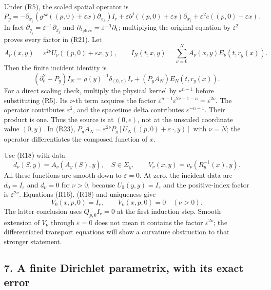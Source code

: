 \documentclass[
  11pt,
]{article}
\begin{document}
Under (R5), the scaled spatial operator is \[
 P_y=-\partial_{x_j}(g^{jk}((p,0)+\varepsilon x)\partial_{x_k})I_r
   +\varepsilon b^j((p,0)+\varepsilon x)\partial_{x_j}
   +\varepsilon^2c((p,0)+\varepsilon x).                    \tag{R21}
\] In fact \(\partial_{q_j}=\varepsilon^{-1}\partial_{x_j}\) and
\(\partial_{t_{\rm phys}}=\varepsilon^{-1}\partial_t\); multiplying the
original equation by \(\varepsilon^2\) proves every factor in (R21). Let
\[
 A_\nu(x,y)=\varepsilon^{2\nu}U_\nu((p,0)+\varepsilon x,y),
 \qquad I_N(t,x,y)=\sum_{\nu=0}^N A_\nu(x,y)E_\nu(t,r_y(x)).  \tag{R22}
\] Then the finite incident identity is \[
 (\partial_t^2+P_y)I_N
   =\rho(y)^{-1}\delta_{(0,e)}I_r
          +(P_yA_N)E_N(t,r_y(x)).                           \tag{R23}
\] For a direct scaling check, multiply the physical kernel by
\(\varepsilon^{n-1}\) before substituting (R5). Its \(\nu\)-th term
acquires the factor
\(\varepsilon^{n-1}\varepsilon^{2\nu+1-n}=\varepsilon^{2\nu}\). The
operator contributes \(\varepsilon^2\), and the spacetime delta
contributes \(\varepsilon^{-n-1}\). Their product is one. Thus the
source is at \((0,e)\), not at the unscaled coordinate value \((0,y)\).
In (R23),
\(P_yA_N=\varepsilon^{2\nu}P_y[U_N((p,0)+\varepsilon\,\cdot,y)]\) with
\(\nu=N\); the operator differentiates the composed function of \(x\).

Use (R18) with data \[
 d_\nu(S,y)=A_\nu(A_y(S),y),\quad S\in\Sigma_y,
 \qquad V_\nu(x,y)=v_\nu(R_y^{-1}(x),y).                     \tag{R24}
\] All these functions are smooth down to \(\varepsilon=0\). At zero,
the incident data are \(d_0=I_r\) and \(d_\nu=0\) for \(\nu>0\), because
\(U_0(y,y)=I_r\) and the positive-index factor is
\(\varepsilon^{2\nu}\). Equations (R16), (R18) and uniqueness give \[
 V_0(x,p,0)=I_r,\qquad V_\nu(x,p,0)=0\quad(\nu>0).          \tag{R25}
\] The latter conclusion uses \(Q_{p,0}I_r=0\) at the first induction
step. Smooth extension of \(V_\nu\) through \(\varepsilon=0\) does not
mean it contains the factor \(\varepsilon^{2\nu}\); the differentiated
transport equations will show a curvature obstruction to that stronger
statement.

\subsection{7. A finite Dirichlet parametrix, with its exact
error}\label{a-finite-dirichlet-parametrix-with-its-exact-error}
\end{document}

